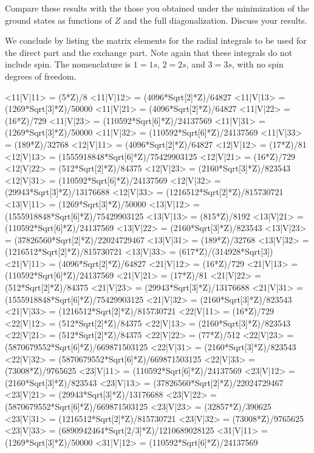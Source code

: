 \documentclass[%
oneside,                 %
final,                   %
10pt]{article}
\begin{document}
Compare these results with the those you obtained under the
minimization of the ground states as functions of $Z$ and the full
diagonalization. Discuss your results.




We conclude by listing the matrix elements for the radial integrals to
be used for the direct part and the exchange part. Note again that
these integrals do not include spin. The nomenclature is $1=1s$,
$2=2s$, and $3=3s$, with no spin degrees of freedom.

\begin{print}
<11|V|11> = (5*Z)/8
<11|V|12> = (4096*Sqrt[2]*Z)/64827
<11|V|13> = (1269*Sqrt[3]*Z)/50000
<11|V|21> = (4096*Sqrt[2]*Z)/64827
<11|V|22> = (16*Z)/729
<11|V|23> = (110592*Sqrt[6]*Z)/24137569
<11|V|31> = (1269*Sqrt[3]*Z)/50000
<11|V|32> = (110592*Sqrt[6]*Z)/24137569
<11|V|33> = (189*Z)/32768
<12|V|11> = (4096*Sqrt[2]*Z)/64827
<12|V|12> = (17*Z)/81
<12|V|13> = (1555918848*Sqrt[6]*Z)/75429903125
<12|V|21> = (16*Z)/729
<12|V|22> = (512*Sqrt[2]*Z)/84375
<12|V|23> = (2160*Sqrt[3]*Z)/823543
<12|V|31> = (110592*Sqrt[6]*Z)/24137569
<12|V|32> = (29943*Sqrt[3]*Z)/13176688
<12|V|33> = (1216512*Sqrt[2]*Z)/815730721
<13|V|11> = (1269*Sqrt[3]*Z)/50000
<13|V|12> = (1555918848*Sqrt[6]*Z)/75429903125
<13|V|13> = (815*Z)/8192
<13|V|21> = (110592*Sqrt[6]*Z)/24137569
<13|V|22> = (2160*Sqrt[3]*Z)/823543
<13|V|23> = (37826560*Sqrt[2]*Z)/22024729467
<13|V|31> = (189*Z)/32768
<13|V|32> = (1216512*Sqrt[2]*Z)/815730721
<13|V|33> = (617*Z)/(314928*Sqrt[3])
<21|V|11> = (4096*Sqrt[2]*Z)/64827
<21|V|12> = (16*Z)/729
<21|V|13> = (110592*Sqrt[6]*Z)/24137569
<21|V|21> = (17*Z)/81
<21|V|22> = (512*Sqrt[2]*Z)/84375
<21|V|23> = (29943*Sqrt[3]*Z)/13176688
<21|V|31> = (1555918848*Sqrt[6]*Z)/75429903125
<21|V|32> = (2160*Sqrt[3]*Z)/823543
<21|V|33> = (1216512*Sqrt[2]*Z)/815730721
<22|V|11> = (16*Z)/729
<22|V|12> = (512*Sqrt[2]*Z)/84375
<22|V|13> = (2160*Sqrt[3]*Z)/823543
<22|V|21> = (512*Sqrt[2]*Z)/84375
<22|V|22> = (77*Z)/512
<22|V|23> = (5870679552*Sqrt[6]*Z)/669871503125
<22|V|31> = (2160*Sqrt[3]*Z)/823543
<22|V|32> = (5870679552*Sqrt[6]*Z)/669871503125
<22|V|33> = (73008*Z)/9765625
<23|V|11> = (110592*Sqrt[6]*Z)/24137569
<23|V|12> = (2160*Sqrt[3]*Z)/823543
<23|V|13> = (37826560*Sqrt[2]*Z)/22024729467
<23|V|21> = (29943*Sqrt[3]*Z)/13176688
<23|V|22> = (5870679552*Sqrt[6]*Z)/669871503125
<23|V|23> = (32857*Z)/390625
<23|V|31> = (1216512*Sqrt[2]*Z)/815730721
<23|V|32> = (73008*Z)/9765625
<23|V|33> = (6890942464*Sqrt[2/3]*Z)/1210689028125
<31|V|11> = (1269*Sqrt[3]*Z)/50000
<31|V|12> = (110592*Sqrt[6]*Z)/24137569

\end{print}
\end{document}
